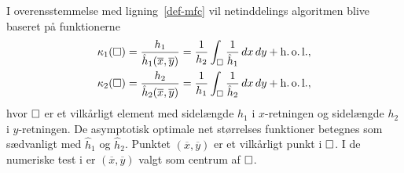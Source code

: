 I overensstemmelse med ligning~\eqref{def-mfc} vil netinddelings algoritmen
blive baseret på funktionerne
\begin{align}
  \kappa_1(\Box) &= \frac{h_1}{\hat{h}_1(\overline{x},\overline{y})} =
    \frac{1}{h_2}\int_\Box \frac{1}{\hat{h}_1}\, dx\, dy + \operatorname{h.o.l.} , \label{kappa1} \\
  \kappa_2(\Box) &= \frac{h_2}{\hat{h}_2(\overline{x},\overline{y})} =
    \frac{1}{h_1}\int_\Box \frac{1}{\hat{h}_2}\, dx\, dy + \operatorname{h.o.l.} , \label{kappa2}
\end{align}
hvor $\Box$ er et vilkårligt element med sidelængde $h_1$ i
$x$-retningen og sidelængde $h_2$ i $y$-retningen. De asymptotisk
optimale net størrelses funktioner betegnes som sædvanligt
med $\hat{h}_1$ og $\hat{h}_2$. Punktet $(\overline{x},\overline{y})$
er et vilkårligt punkt i $\Box$. I de numeriske test i \cite{hugger-net} er
$(\overline{x},\overline{y})$ valgt som centrum af $\Box$.

